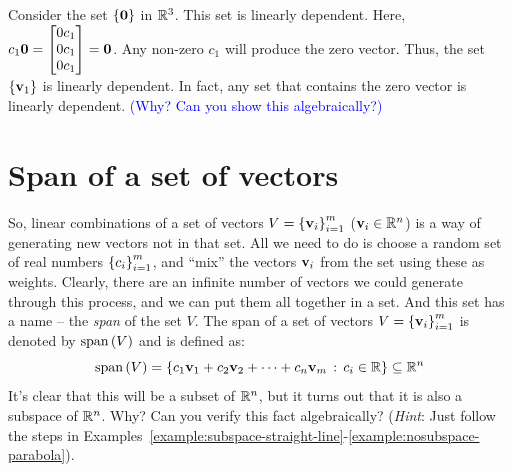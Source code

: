 \begin{boxedstuff}
    \begin{example}
        Consider the set $\left\{ \mathbf{0} \right\}$ in $\mathbb{R}^3$. This set is linearly dependent. Here, $c_1 \mf{0} = \bmx 0 c_1 \\ 0 c_1 \\ 0 c_1 \emx = \mf{0}$. Any non-zero $c_1$ will produce the zero vector. Thus, the set $\left\{ \mathbf{v}_1 \right\}$ is linearly dependent. In fact, any set that contains the zero vector is linearly dependent. \textcolor{blue}{(Why? Can you show this algebraically?)}
    \end{example}
\end{boxedstuff}

\section{Span of a set of vectors}\label{sec:ch01-span}
So, linear combinations of a set of vectors $V = \left\{ \mathbf{v}_i \right\}_{i=1}^{m}$ ($\mathbf{v}_i \in \mathbb{R}^n$) is a way of generating new vectors not in that set. All we need to do is choose a random set of real numbers $\left\{ c_i \right\}_{i=1}^{m}$, and ``mix'' the vectors $\mathbf{v}_i$ from the set using these as weights. Clearly, there are an infinite number of vectors we could generate through this process, and we can put them all together in a set. And this set has a name -- the \textit{span} of the set $V$. The span of a set of vectors $V = \left\{ \mathbf{v}_i \right\}_{i=1}^{m}$ is denoted by $\text{span}\left( V \right)$ and is defined as:
\begin{equation}
    \text{span}\left( V \right) = \left\{ c_1 \mathbf{v}_1 + c_2 \mathbf{v}_2 + \cdots + c_n \mathbf{v}_m \, : \, c_i \in \mathbb{R} \right\} \subseteq \mathbb{R}^n
    \label{eq:span-vec}
\end{equation}
It's clear that this will be a subset of $\mathbb{R}^n$, but it turns out that it is also a subspace of $\mathbb{R}^n$. Why? Can you verify this fact algebraically? (\textit{Hint}: Just follow the steps in Examples~\ref{example:subspace-straight-line}-\ref{example:nosubspace-parabola}).

